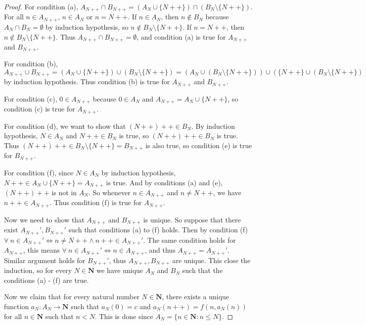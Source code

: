 \begin{proof}
    For condition (a), \(A_{N++} \cap B_{N++} = (A_N \cup \{N++\}) \cap (B_N \setminus \{N++\})\).
    For all \(n \in A_{N++}\), \(n \in A_N\) or \(n = N++\).
    If \(n \in A_N\), then \(n \notin B_N\) because \(A_N \cap B_N = \emptyset\) by induction hypothesis, so \(n \notin B_N \setminus \{N++\}\).
    If \(n = N++\), then \(n \notin B_N \setminus \{N++\}\).
    Thus \(A_{N++} \cap B_{N++} = \emptyset\), and condition (a) is true for \(A_{N++}\) and \(B_{N++}\).

    For condition (b), \(A_{N++} \cup B_{N++} = (A_N \cup \{N++\}) \cup (B_N \setminus \{N++\}) = (A_N \cup (B_N \setminus \{N++\})) \cup (\{N++\} \cup (B_N \setminus \{N++\})) = (A_N \cup (B_N \setminus \{N++\})) \cup B_N = A_N \cup B_N = \mathbf{N}\) by induction hypothesis.
    Thus condition (b) is true for \(A_{N++}\) and \(B_{N++}\).

    For condition (c), \(0 \in A_{N++}\) because \(0 \in A_N\) and \(A_{N++} = A_N \cup \{N++\}\), so condition (c) is true for \(A_{N++}\).

    For condition (d), we want to show that \((N++)++ \in B_N\).
    By induction hypothesis, \(N \in A_N\) and \(N++ \in B_N\) is true, so \((N++)++ \in B_N\) is true.
    Thus \((N++)++ \in B_N \setminus \{N++\} = B_{N++}\) is also true, so condition (e) is true for \(B_{N++}\).

    For condition (f), since \(N \in A_N\) by induction hypothesis, \(N++ \in A_N \cup \{N++\} = A_{N++}\) is true.
    And by conditions (a) and (e), \((N++)++\) is not in \(A_N\).
    So whenever \(n \in A_{N++}\) and \(n \neq N++\), we have \(n++ \in A_{N++}\).
    Thus condition (f) is true for \(A_{N++}\).

    Now we need to show that \(A_{N++}\) and \(B_{N++}\) is unique.
    So suppose that there exist \(A_{N++}', B_{N++}'\) such that conditions (a) to (f) holds.
    Then by condition (f) \(\forall\ n \in A_{N++}' \iff n \neq N++ \land n++ \in A_{N++}'\).
    The same condition holds for \(A_{N++}\), this means \(\forall\ n \in A_{N++}' \iff n \in A_{N++}\), and thus \(A_{N++} = A_{N++}'\).
    Similar argument holds for \(B_{N++}'\), thus \(A_{N++}, B_{N++}\) are unique.
    This close the induction, so for every \(N \in \mathbf{N}\) we have unique \(A_N\) and \(B_N\) such that the conditions (a) - (f) are true.

    Now we claim that for every natural number \(N \in \mathbf{N}\), there exists a unique function \(a_N : A_N \to \mathbf{N}\) such that \(a_N(0) = c\) and \(a_N(n++) = f(n, a_{N}(n))\) for all \(n \in \mathbf{N}\) such that \(n < N\).
    This is done since \(A_N = \{n \in \mathbf{N} : n \leq N\}\).
\end{proof}

